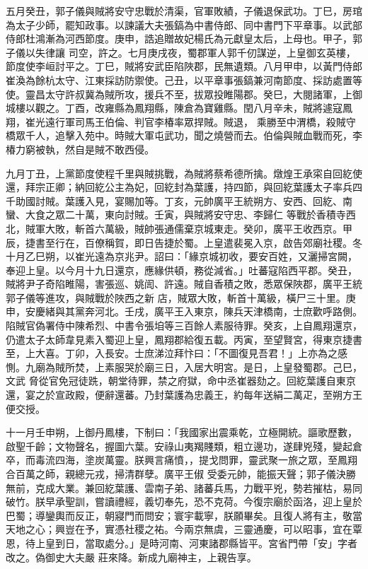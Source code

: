 \begin{pinyinscope}
 五月癸丑，郭子儀與賊將安守忠戰於清渠，官軍敗績，子儀退保武功。丁巳，房琯為太子少師，罷知政事。以諫議大夫張鎬為中書侍郎、同中書門下平章事。以武部侍郎杜鴻漸為河西節度。庚申，誥追贈故妃楊氏為元獻皇太后，上母也。甲子，郭子儀以失律讓
 司空，許之。七月庚戌夜，蜀郡軍人郭千仞謀逆，上皇御玄英樓，節度使李峘討平之。丁巳，賊將安武臣陷陜郡，民無遺類。八月甲申，以黃門侍郎崔渙為餘杭太守、江東採訪防禦使。己丑，以平章事張鎬兼河南節度、採訪處置等使。靈昌太守許叔冀為賊所攻，援兵不至，拔眾投睢陽郡。癸巳，大閱諸軍，上御城樓以觀之。丁酉，改雍縣為鳳翔縣，陳倉為寶雞縣。閏八月辛未，賊將遽寇鳳翔，崔光遠行軍司馬王伯倫、判官李椿率眾捍賊。賊退，
 乘勝至中渭橋，殺賊守橋眾千人，追擊入苑中。時賊大軍屯武功，聞之燒營而去。伯倫與賊血戰而死，李椿力窮被執，然自是賊不敢西侵。



 九月丁丑，上黨節度使程千里與賊挑戰，為賊將蔡希德所擒。燉煌王承寀自回紇使還，拜宗正卿；納回紇公主為妃，回紇封為葉護，持四節，與回紇葉護太子率兵四千助國討賊。葉護入見，宴賜加等。丁亥，元帥廣平王統朔方、安西、回紇、南蠻、大食之眾二十萬，東向討賊。壬寅，與賊將安守忠、李歸仁
 等戰於香積寺西北，賊軍大敗，斬首六萬級，賊帥張通儒棄京城東走。癸卯，廣平王收西京。甲辰，捷書至行在，百僚稱賀，即日告捷於蜀。上皇遣裴冕入京，啟告郊廟社稷。冬十月乙巳朔，以崔光遠為京兆尹。詔曰：「緣京城初收，要安百姓，又灑掃宮闕，奉迎上皇。以今月十九日還京，應緣供頓，務從減省。」吐蕃寇陷西平郡。癸丑，賊將尹子奇陷睢陽，害張巡、姚訚、許遠。賊自香積之敗，悉眾保陜郡，廣平王統郭子儀等進攻，與賊戰於陜西之新
 店，賊眾大敗，斬首十萬級，橫尸三十里。庚申，安慶緒與其黨奔河北。壬戌，廣平王入東京，陳兵天津橋南，士庶歡呼路側。陷賊官偽署侍中陳希烈、中書令張垍等三百餘人素服待罪。癸亥，上自鳳翔還京，仍遣太子太師韋見素入蜀迎上皇，鳳翔郡給復五載。丙寅，至望賢宮，得東京捷書至，上大喜。丁卯，入長安。士庶涕泣拜忭曰：「不圖復見吾君！」上亦為之感惻。九廟為賊所焚，上素服哭於廟三日，入居大明宮。是日，上皇發蜀郡。己巳，文武
 脅從官免冠徒跣，朝堂待罪，禁之府獄，命中丞崔器劾之。回紇葉護自東京還，宴之於宣政殿，便辭還蕃。乃封葉護為忠義王，約每年送絹二萬疋，至朔方王便交授。



 十一月壬申朔，上御丹鳳樓，下制曰：「我國家出震乘乾，立極開統。謳歌歷數，啟聖千齡；文物聲名，握圖六葉。安祿山夷羯賤類，粗立邊功，遂肆兇殘，變起倉卒，而毒流四海，塗炭萬靈。朕興言痛憤，，提戈問罪，靈武聚一旅之眾，至鳳翔合百萬之師，親總元戎，掃清群孽。廣平王俶
 受委元帥，能振天聲；郭子儀決勝無前，克成大業。兼回紇葉護、雲南子弟、諸蕃兵馬，力戰平兇，勢若摧枯，易同破竹。朕早承聖訓，嘗讀禮經，義切奉先，恐不克荷。今復宗廟於函洛，迎上皇於巴蜀；導鑾輿而反正，朝寢門而問安；寰宇載寧，朕願畢矣。且復人將有主，敬當天地之心；興豈在予，實憑社稷之祐。今兩京無虞，三靈通慶，可以昭事，宜在覃恩，待上皇到日，當取處分。」是時河南、河東諸郡縣皆平。宮省門帶「安」字者改之。偽御史大夫嚴
 莊來降。新成九廟神主，上親告享。




\end{pinyinscope}
